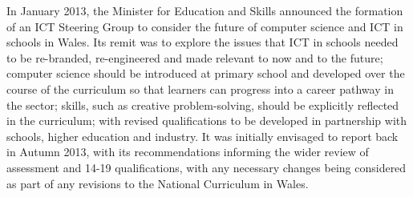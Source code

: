 \documentclass{llncs}
\begin{document}




In January 2013, the Minister for Education and Skills
announced the formation of an ICT Steering Group to consider
the future of computer science and ICT in schools in Wales.
Its remit was to explore the issues that ICT in schools needed to be
re-branded, re-engineered and made relevant to now and to the future;
computer science should be introduced at primary school and developed
over the course of the curriculum so that learners can progress into a
career pathway in the sector; skills, such as creative
problem-solving, should be explicitly reflected in the curriculum;
with revised qualifications to be developed in partnership with
schools, higher education and industry.  It was initially envisaged to
report back in Autumn 2013, with its recommendations informing the
wider review of assessment and 14-19
qualifications, with any necessary changes
being considered as part of any revisions to the National Curriculum
in Wales.
\end{document}
